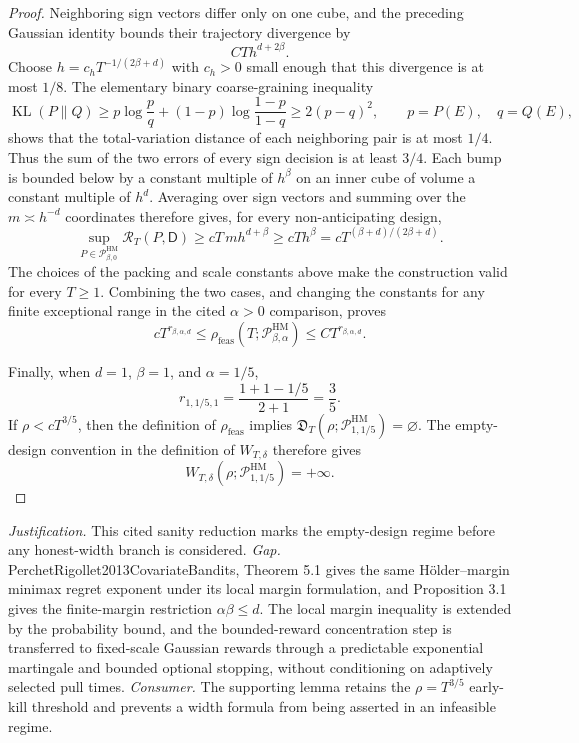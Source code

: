 \documentclass{article}
\begin{document}
\begin{proof}
Neighboring sign vectors differ only on one cube, and the preceding Gaussian identity bounds their trajectory divergence by
\[
 CT h^{d+2\beta}.
\]
Choose \(h=c_hT^{-1/(2\beta+d)}\) with \(c_h>0\) small enough that this divergence is at most \(1/8\).  The elementary binary coarse-graining inequality
\[
 \operatorname{KL}(P\|Q)
 \geq p\log\frac pq+(1-p)\log\frac{1-p}{1-q}
 \geq2(p-q)^2,
 \qquad p=P(E),\quad q=Q(E),
\]
shows that the total-variation distance of each neighboring pair is at most \(1/4\).  Thus the sum of the two errors of every sign decision is at least \(3/4\).  Each bump is bounded below by a constant multiple of \(h^\beta\) on an inner cube of volume a constant multiple of \(h^d\).  Averaging over sign vectors and summing over the \(m\asymp h^{-d}\) coordinates therefore gives, for every non-anticipating design,
\[
 \sup_{P\in\mathcal P_{\beta,0}^{\mathrm{HM}}}
 \mathcal R_T(P,\mathsf D)
 \geq cT\,m h^{d+\beta}
 \geq cTh^\beta
 =cT^{(\beta+d)/(2\beta+d)}.
\]
The choices of the packing and scale constants above make the construction valid for every \(T\geq1\).  Combining the two cases, and changing the constants for any finite exceptional range in the cited \(\alpha>0\) comparison, proves
\[
 cT^{r_{\beta,\alpha,d}}
 \leq\rho_{\mathrm{feas}}(T;\mathcal P_{\beta,\alpha}^{\mathrm{HM}})
 \leq CT^{r_{\beta,\alpha,d}}.
\]

Finally, when \(d=1\), \(\beta=1\), and \(\alpha=1/5\),
\[
 r_{1,1/5,1}
 =\frac{1+1-1/5}{2+1}=\frac35.
\]
If \(\rho<cT^{3/5}\), then the definition of \(\rho_{\mathrm{feas}}\) implies \(\mathfrak D_T(\rho;\mathcal P_{1,1/5}^{\mathrm{HM}})=\varnothing\).  The empty-design convention in the definition of \(W_{T,\delta}\) therefore gives
\[
 W_{T,\delta}(\rho;\mathcal P_{1,1/5}^{\mathrm{HM}})=+\infty.
\]
\end{proof}
\par\smallskip\noindent \textit{Justification.} This cited sanity reduction marks the empty-design regime before any honest-width branch is considered. \textit{Gap.} PerchetRigollet2013CovariateBandits, Theorem 5.1 gives the same H\"older--margin minimax regret exponent under its local margin formulation, and Proposition 3.1 gives the finite-margin restriction \(\alpha\beta\le d\). The local margin inequality is extended by the probability bound, and the bounded-reward concentration step is transferred to fixed-scale Gaussian rewards through a predictable exponential martingale and bounded optional stopping, without conditioning on adaptively selected pull times. \textit{Consumer.} The supporting lemma retains the \(\rho=T^{3/5}\) early-kill threshold and prevents a width formula from being asserted in an infeasible regime.
\end{document}
